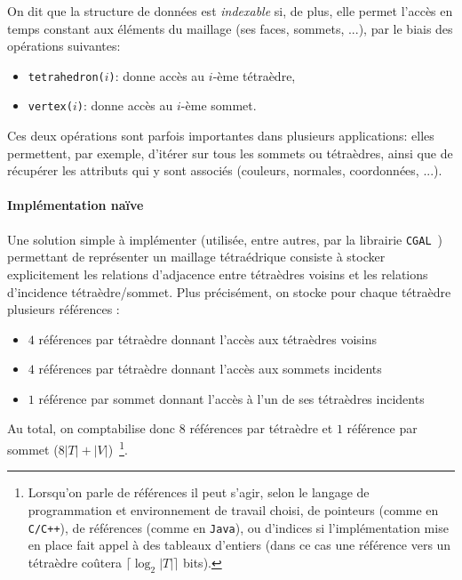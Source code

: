 On dit que la structure de données est \emph{indexable} si, de plus, elle permet l'accès en temps constant aux éléments du maillage (ses faces, sommets, ...), par le biais des opérations suivantes:
\begin{itemize}
\item \texttt{tetrahedron($i$)}: donne accès au $i$-ème tétraèdre,
\item \texttt{vertex($i$)}: donne accès au $i$-ème sommet.
\end{itemize}
Ces deux opérations sont parfois importantes dans plusieurs applications: elles permettent, par exemple, d'itérer sur tous les sommets ou tétraèdres,
ainsi que de récupérer les attributs qui y sont associés (couleurs, normales, coordonnées, ...).

\paragraph{Implémentation naïve}
Une solution simple à implémenter (utilisée, entre autres, par la librairie \texttt{CGAL}~\cite{CGAL}) permettant de représenter un maillage tétraédrique consiste à stocker explicitement les relations d'adjacence entre tétraèdres voisins et les relations d'incidence tétraèdre/sommet. Plus précisément, on stocke pour chaque tétraèdre plusieurs références : 
\begin{itemize}
\item $4$ références par tétraèdre donnant l'accès aux tétraèdres voisins
\item $4$ références par tétraèdre donnant l'accès aux sommets incidents
\item $1$ référence par sommet donnant l'accès à l'un de ses tétraèdres incidents
\end{itemize}
Au total, on comptabilise donc $8$ références par tétraèdre et $1$ référence par sommet ($8|T|+|V|$)~\footnote{Lorsqu'on parle de références il peut s'agir, selon le langage de programmation et environnement de travail choisi, de pointeurs (comme en \texttt{C/C++}), 
de références (comme en \texttt{Java}), ou d'indices si l'implémentation mise en place fait appel à des tableaux d'entiers (dans ce cas une référence vers un tétraèdre co\^utera
$\lceil\log_2 |T|\rceil$ bits).}.